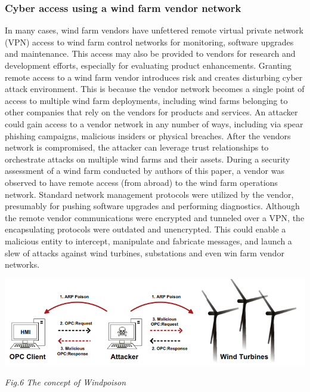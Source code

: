\documentclass[twosided,a4,10pt]{article}
\begin{document}
\begin{multicols}{2}
 \subsubsection{Cyber access using a wind farm vendor network}
 In many cases, wind farm vendors have unfettered remote virtual private network (VPN) access to wind farm control networks for monitoring, software upgrades and maintenance. This access may also be provided to vendors for research and development efforts, especially for evaluating product enhancements. Granting remote access to a wind farm vendor introduces risk and creates disturbing cyber attack environment. This is because the vendor network becomes a single point of access to multiple wind farm deployments, including wind farms belonging to other companies that rely on the vendors for products and services. An attacker could gain access to a vendor network in any number of ways, including via spear phishing campaigns, malicious insiders or physical breaches. After the vendors network is compromised, the attacker can leverage trust relationships to orchestrate attacks on multiple wind farms and their assets. During a security assessment of a wind farm conducted by authors of this paper, a vendor was observed to have remote access (from abroad) to the wind farm operations network. Standard network management protocols were utilized by the vendor, presumably for pushing software upgrades and performing diagnostics. Although the remote vendor communications were encrypted and tunneled over a VPN, the encapsulating protocols were outdated and unencrypted. This could enable a malicious entity to intercept, manipulate and fabricate messages, and launch a slew of attacks against wind turbines, substations and even win farm vendor networks.
 
\end{multicols}
\includegraphics{cache_poison}
\begin{center}
	\textit{Fig.6 The concept of Windpoison}
\end{center}
\end{document}
